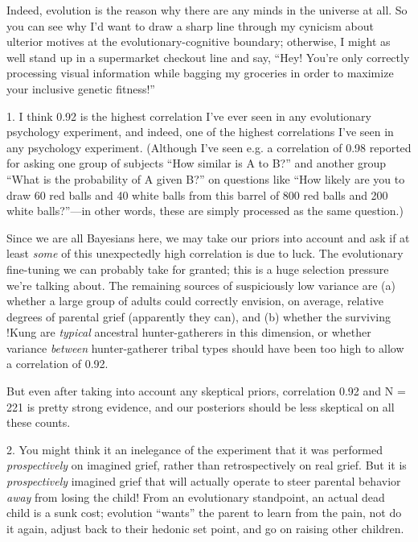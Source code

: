 {
 Indeed, evolution is the reason why there are any minds in the
universe at all. So you can see why I'd want to draw a
sharp line through my cynicism about ulterior motives at the
evolutionary-cognitive boundary; otherwise, I might as well stand up in
a supermarket checkout line and say, ``Hey!
You're only correctly processing visual information
while bagging my groceries in order to maximize your inclusive genetic
fitness!''}

{
 1. I think 0.92 is the highest correlation I've
ever seen in any evolutionary psychology experiment, and indeed, one of
the highest correlations I've seen in any psychology
experiment. (Although I've seen e.g. a correlation of
0.98 reported for asking one group of subjects ``How
similar is A to B?'' and another group
``What is the probability of A given
B?'' on questions like ``How likely
are you to draw 60 red balls and 40 white balls from this barrel of 800
red balls and 200 white balls?''---in other words,
these are simply processed as the same question.)

 Since we are all Bayesians here, we may take our priors into
account and ask if at least \textit{some} of this unexpectedly high
correlation is due to luck. The evolutionary fine-tuning we can
probably take for granted; this is a huge selection pressure
we're talking about. The remaining sources of
suspiciously low variance are (a) whether a large group of adults could
correctly envision, on average, relative degrees of parental grief
(apparently they can), and (b) whether the surviving !Kung are
\textit{typical} ancestral hunter-gatherers in this dimension, or
whether variance \textit{between} hunter-gatherer tribal types should
have been too high to allow a correlation of 0.92.

 But even after taking into account any skeptical priors,
correlation 0.92 and N = 221 is pretty strong evidence, and our
posteriors should be less skeptical on all these counts.}

{
 2. You might think it an inelegance of the experiment that it was
performed \textit{prospectively} on imagined grief, rather than
retrospectively on real grief. But it is \textit{prospectively}
imagined grief that will actually operate to steer parental behavior
\textit{away} from losing the child! From an evolutionary standpoint,
an actual dead child is a sunk cost; evolution
``wants'' the parent to learn from
the pain, not do it again, adjust back to their hedonic set point, and
go on raising other children.}

